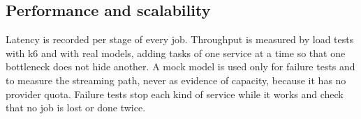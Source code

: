 \subsection{Performance and scalability}
Latency is recorded per stage of every job. Throughput is measured by load tests with k6 and with real models, adding tasks of one service at a time so that one bottleneck does not hide another. A mock model is used only for failure tests and to measure the streaming path, never as evidence of capacity, because it has no provider quota. Failure tests stop each kind of service while it works and check that no job is lost or done twice.
